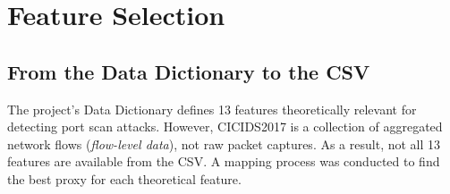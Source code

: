 \section{Feature Selection}

\subsection{From the Data Dictionary to the CSV}

The project's Data Dictionary defines 13 features theoretically relevant for detecting port scan attacks. However, CICIDS2017 is a collection of aggregated network flows (\textit{flow-level data}), not raw packet captures. As a result, not all 13 features are available from the CSV. A mapping process was conducted to find the best proxy for each theoretical feature.

